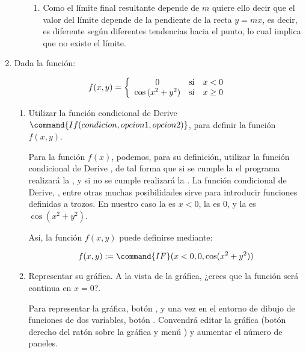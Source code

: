 \begin{enumerate}[leftmargin=*]
\begin{enumerate}
\begin{indication}
{\begin{enumerate}
\item Como el límite final resultante depende de $m$ quiere ello
decir que el valor del límite depende de la pendiente de la recta
$y=mx$, es decir, es diferente según diferentes tendencias hacia
el punto, lo cual implica que no existe el límite.

\end{enumerate}

}
\end{indication}


\end{enumerate}

\item Dada la función:

\[
f(x,y) = \left\{ {\begin{array}{*{20}c}
   0 & {\text{si}} & {x <0}  \\
   \cos{(x^2+y^2)}& {\text{si}} & {x\geq 0}  \\

 \end{array} } \right.
\]

\begin{enumerate}
  \item Utilizar la función condicional de Derive $\command{If(condicion,opcion 1,opcion 2)}$,
   para definir la función $f(x,y)$.


\begin{indication}
{Para la función $f(x)$, podemos, para su definición, utilizar la
función condicional de Derive , de tal forma que si se cumple la  el
programa realizará la , y si no se cumple
realizará la . La función condicional de Derive,
, entre otras muchas posibilidades sirve para introducir
funciones definidas a trozos. En nuestro caso la 
es $x<0$, la  es $0$, y la  es
$\cos(x^2+y^2)$.

Así, la función $f(x,y)$ puede definirse mediante:

\[
f(x,y):=\command{IF}(x<0,0,\cos(x^2+y^2))
\]

}
\end{indication}


  \item Representar su gráfica. A la vista de la gráfica, ¿crees
  que la función será continua en $x=0$?.


\begin{indication}
{Para representar la gráfica, botón , y una vez en
el entorno de dibujo de funciones de dos variables, botón
. Convendrá editar la gráfica (botón derecho del
ratón sobre la gráfica y menú ) y aumentar el número de
paneles. }
\end{indication}



\end{enumerate}
\end{enumerate}
